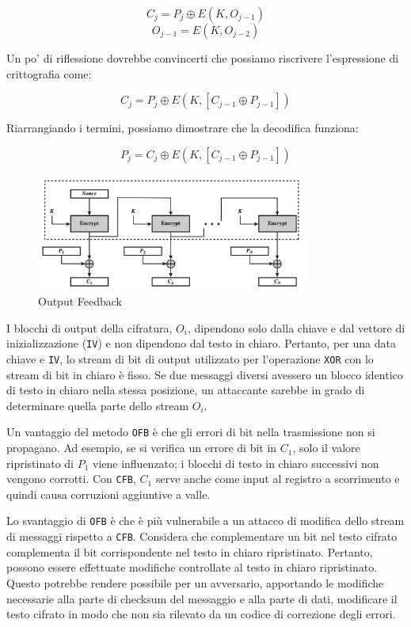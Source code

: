 \[ C_j = P_j \oplus E(K, O_{j-1}) \]
\[ O_{j-1} = E(K, O_{j-2}) \]

Un po' di riflessione dovrebbe convincerti che possiamo riscrivere
l'espressione di crittografia come:

\[ C_j = P_j \oplus E(K, [C_{j-1} \oplus P_{j-1}]) \]

Riarrangiando i termini, possiamo dimostrare che la decodifica funziona:

\[ P_j = C_j \oplus E(K, [C_{j-1} \oplus P_{j-1}]) \]

\begin{figure}[H]
    \centering
    \includegraphics[width=0.8\textwidth]{img/outputFeedback.png}
    \caption{Output Feedback}
    \label{fig:outputFeedback}
\end{figure}
I blocchi di output della cifratura, \(O_i\), dipendono solo dalla chiave
e dal vettore di inizializzazione (\verb|IV|) e non dipendono dal testo
in chiaro. Pertanto, per una data chiave e \verb|IV|, lo stream di bit di
output utilizzato per l'operazione \texttt{XOR} con lo stream di bit in chiaro è fisso.
Se due messaggi diversi avessero un blocco identico di testo in chiaro
nella stessa posizione, un attaccante sarebbe in grado di determinare
quella parte dello stream \(O_i\).

Un vantaggio del metodo \verb|OFB| è che gli errori di bit nella trasmissione non
si propagano. Ad esempio, se si verifica un errore di bit in \(C_1\), solo
il valore ripristinato di \(P_1\) viene influenzato; i blocchi di testo in
chiaro successivi non vengono corrotti. Con \verb|CFB|, \(C_1\) serve anche come
input al registro a scorrimento e quindi causa corruzioni aggiuntive a valle.

Lo svantaggio di \verb|OFB| è che è più vulnerabile a un attacco di modifica dello
stream di messaggi rispetto a \verb|CFB|. Considera che complementare un bit nel
testo cifrato complementa il bit corrispondente nel testo in chiaro
ripristinato. Pertanto, possono essere effettuate modifiche controllate
al testo in chiaro ripristinato. Questo potrebbe rendere possibile per un
avversario, apportando le modifiche necessarie alla parte di checksum del
messaggio e alla parte di dati, modificare il testo cifrato in modo che non
sia rilevato da un codice di correzione degli errori.

